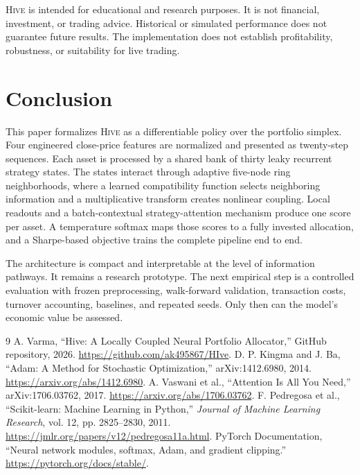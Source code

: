 \documentclass[10pt,a4paper,twocolumn]{article}
\newcommand{\Hive}{\textsc{Hive}}
\begin{document}
\Hive{} is intended for educational and research purposes. It is not financial, investment, or trading advice. Historical or simulated performance does not guarantee future results. The implementation does not establish profitability, robustness, or suitability for live trading.

\section{Conclusion}
This paper formalizes \Hive{} as a differentiable policy over the portfolio simplex. Four engineered close-price features are normalized and presented as twenty-step sequences. Each asset is processed by a shared bank of thirty leaky recurrent strategy states. The states interact through adaptive five-node ring neighborhoods, where a learned compatibility function selects neighboring information and a multiplicative transform creates nonlinear coupling. Local readouts and a batch-contextual strategy-attention mechanism produce one score per asset. A temperature softmax maps those scores to a fully invested allocation, and a Sharpe-based objective trains the complete pipeline end to end.

The architecture is compact and interpretable at the level of information pathways. It remains a research prototype. The next empirical step is a controlled evaluation with frozen preprocessing, walk-forward validation, transaction costs, turnover accounting, baselines, and repeated seeds. Only then can the model's economic value be assessed.

\begin{thebibliography}{9}
 A. Varma, ``Hive: A Locally Coupled Neural Portfolio Allocator,'' GitHub repository, 2026. \url{https://github.com/ak495867/HIve}.
 D. P. Kingma and J. Ba, ``Adam: A Method for Stochastic Optimization,'' arXiv:1412.6980, 2014. \url{https://arxiv.org/abs/1412.6980}.
 A. Vaswani et al., ``Attention Is All You Need,'' arXiv:1706.03762, 2017. \url{https://arxiv.org/abs/1706.03762}.
 F. Pedregosa et al., ``Scikit-learn: Machine Learning in Python,'' \emph{Journal of Machine Learning Research}, vol. 12, pp. 2825--2830, 2011. \url{https://jmlr.org/papers/v12/pedregosa11a.html}.
 PyTorch Documentation, ``Neural network modules, softmax, Adam, and gradient clipping.'' \url{https://pytorch.org/docs/stable/}.
\end{thebibliography}
\end{document}
